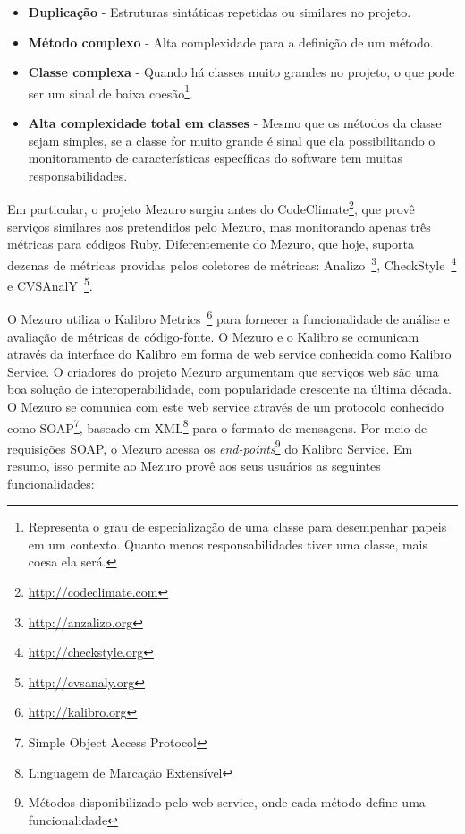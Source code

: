 \begin{itemize}
	\begin{itemize}
	\item \textbf{Duplicação} - Estruturas sintáticas repetidas ou similares no projeto.
	\item \textbf{Método complexo} - Alta complexidade para a definição de um método.
	\item \textbf{Classe complexa} - Quando há classes muito grandes no projeto, o que pode ser um sinal de baixa coesão\footnote{Representa o grau de especialização de uma classe para desempenhar papeis em um contexto. Quanto menos responsabilidades tiver uma classe, mais coesa ela será.}.
	\item \textbf{Alta complexidade total em classes} - Mesmo que os métodos da classe sejam simples, se a classe for muito grande é sinal que ela possibilitando o monitoramento de características específicas do software tem muitas responsabilidades.
	\end{itemize}
\end{itemize}
    
Em particular, o projeto Mezuro surgiu antes do CodeClimate\footnote{\url{http://codeclimate.com}}, que provê serviços similares aos pretendidos pelo Mezuro, mas monitorando apenas três métricas para códigos Ruby. Diferentemente do Mezuro, que hoje, suporta dezenas de métricas providas pelos coletores de métricas: Analizo~\footnote{\url{http://anzalizo.org}}, CheckStyle~\footnote{\url{http://checkstyle.org}} e CVSAnalY~\footnote{\url{http://cvsanaly.org}}.



O Mezuro utiliza o Kalibro Metrics~\footnote{\url{http://kalibro.org}} para fornecer a funcionalidade de análise e avaliação de métricas de código-fonte. O Mezuro e o Kalibro se comunicam através da interface do Kalibro em forma de web service conhecida como Kalibro Service.
%
O criadores do projeto Mezuro argumentam que serviços web são uma boa solução de interoperabilidade, com popularidade crescente na última década. O Mezuro se comunica com este web service através de um protocolo conhecido como SOAP\footnote{Simple Object Access Protocol}, baseado em XML\footnote{Linguagem de Marcação Extensível} para o formato de mensagens.
%
Por meio de requisições SOAP, o Mezuro acessa os \textit{end-points}\footnote{Métodos disponibilizado pelo web service, onde cada método define uma funcionalidade} do Kalibro Service. Em resumo, isso permite ao Mezuro provê aos seus usuários as seguintes funcionalidades:

